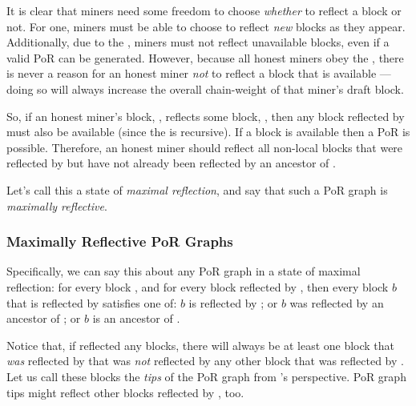 It is clear that miners need some freedom to choose \emph{whether} to reflect a block or not.
For one, miners must be able to choose to reflect \emph{new} blocks as they appear.
Additionally, due to the \AxiomOfAvailability, miners must not reflect unavailable blocks, even if a valid PoR can be generated.
However, because all honest miners obey the \AxiomOfAvailability, there is never a reason for an honest miner \emph{not} to reflect a block that is available --- doing so will always increase the overall chain-weight of that miner's draft block.

So, if an honest miner's block, \BL{}, reflects some block, \BR{}, then any block reflected by \BR{} must also be available (since the \AxiomOfAvailability is recursive).
If a block is available then a PoR is possible.
Therefore, an honest miner should reflect all non-local blocks that were reflected by \BR{} but have not already been reflected by an ancestor of \BL{}.

Let's call this a state of \emph{maximal reflection}, and say that such a PoR graph is \emph{maximally reflective}.

\subsubsection{Maximally Reflective PoR Graphs}

\label{sec:por-graph-max-refl}

Specifically, we can say this about any PoR graph in a state of maximal reflection: for every block \BL{}, and for every block \BR{} reflected by \BL{}, then every block $b$ that is reflected by \BR{} satisfies one of: $b$ is reflected by \BL{}; or $b$ was reflected by an ancestor of \BL{}; or $b$ is an ancestor of \BL{}.

Notice that, if \BL reflected any blocks, there will always be at least one block that \emph{was} reflected by \BL that was \emph{not} reflected by any other block that was reflected by \BL.
Let us call these blocks the \emph{tips} of the PoR graph from \BL{}'s perspective.
PoR graph tips might reflect other blocks reflected by \BL, too.

